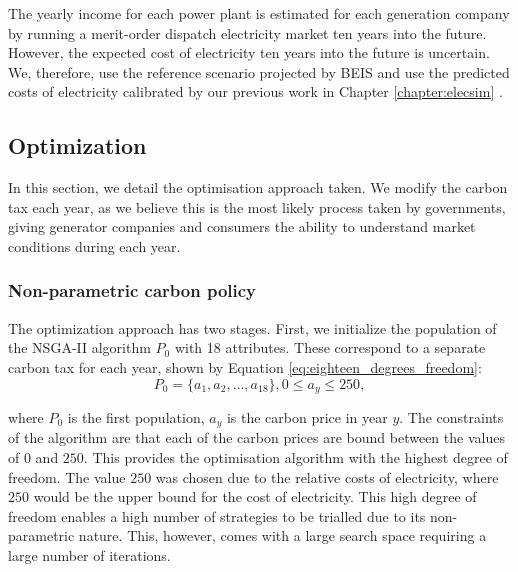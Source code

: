 The yearly income for each power plant is estimated for each generation company by running a merit-order dispatch electricity market ten years into the future. However, the expected cost of electricity ten years into the future is uncertain. We, therefore, use the reference scenario projected by BEIS and use the predicted costs of electricity calibrated by our previous work in Chapter \ref{chapter:elecsim} \cite{DBEIS2019, Kell2020}. 


\subsection{Optimization}

In this section, we detail the optimisation approach taken. We modify the carbon tax each year, as we believe this is the most likely process taken by governments, giving generator companies and consumers the ability to understand market conditions during each year.

\label{ssec:optimization}
\subsubsection{Non-parametric carbon policy}
\label{sssec:non_parametric_strategy}
The optimization approach has two stages. First, we initialize the population of the NSGA-II algorithm $P_0$ with 18 attributes. These correspond to a separate carbon tax for each year, shown by Equation \ref{eq:eighteen_degrees_freedom}:
\begin{equation}
\label{eq:eighteen_degrees_freedom}
P_0=\{a_1,a_2,\ldots,a_{18}\}, 0\leq a_y\leq 250,
\end{equation} 

\noindent where $P_0$ is the first population, $a_y$ is the carbon price in year $y$. The constraints of the algorithm are that each of the carbon prices are bound between the values of \textsterling$0$ and \textsterling$250$. This provides the optimisation algorithm with the highest degree of freedom. The value \textsterling$250$ was chosen due to the relative costs of electricity, where \textsterling$250$ would be the upper bound for the cost of electricity. This high degree of freedom enables a high number of strategies to be trialled due to its non-parametric nature. This, however, comes with a large search space requiring a large number of iterations. 


